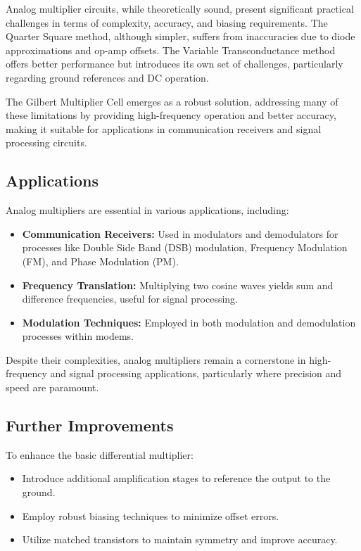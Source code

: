 \documentclass[a4paper,9pt,twoside,openany,twocolumn]{memoir}
\begin{document}
Analog multiplier circuits, while theoretically sound, present significant practical challenges in terms of complexity, accuracy, and biasing requirements. The Quarter Square method, although simpler, suffers from inaccuracies due to diode approximations and op-amp offsets. The Variable Transconductance method offers better performance but introduces its own set of challenges, particularly regarding ground references and DC operation.

The Gilbert Multiplier Cell emerges as a robust solution, addressing many of these limitations by providing high-frequency operation and better accuracy, making it suitable for applications in communication receivers and signal processing circuits.

\subsection{Applications}

Analog multipliers are essential in various applications, including:

\begin{itemize}
    \item \textbf{Communication Receivers:} Used in modulators and demodulators for processes like Double Side Band (DSB) modulation, Frequency Modulation (FM), and Phase Modulation (PM).
    \item \textbf{Frequency Translation:} Multiplying two cosine waves yields sum and difference frequencies, useful for signal processing.
    \item \textbf{Modulation Techniques:} Employed in both modulation and demodulation processes within modems.
\end{itemize}

Despite their complexities, analog multipliers remain a cornerstone in high-frequency and signal processing applications, particularly where precision and speed are paramount.

\subsection{Further Improvements}

To enhance the basic differential multiplier:

\begin{itemize}
    \item Introduce additional amplification stages to reference the output to the ground.
    \item Employ robust biasing techniques to minimize offset errors.
    \item Utilize matched transistors to maintain symmetry and improve accuracy.
\end{itemize}
\end{document}
